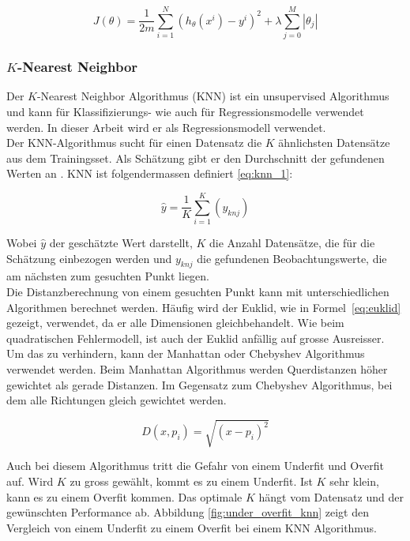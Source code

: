 \begin{equation}\label{eq:lasso}
J(\theta) = \frac{1}{2m} \sum_{i=1}^{N} (h_\theta(x^i) - y^i)^2 + \lambda \sum_{j=0}^{M} |\theta_j|
\end{equation}

\subsubsection{$K$-Nearest Neighbor}
Der $K$-Nearest Neighbor Algorithmus (KNN) ist ein unsupervised Algorithmus und kann für Klassifizierungs- wie auch für Regressionsmodelle verwendet werden. In dieser Arbeit wird er als Regressionsmodell verwendet.\\
Der KNN-Algorithmus sucht für einen Datensatz die $K$ ähnlichsten Datensätze aus dem Trainingsset. Als Schätzung gibt er den Durchschnitt der gefundenen Werten an \cite{knn_1}. KNN ist folgendermassen definiert \eqref{eq:knn_1}:

\begin{equation}\label{eq:knn_1}
\hat{y} = \frac{1}{K} \sum_{i=1}^{K} (y_{knj})
\end{equation}

Wobei $\hat{y}$ der geschätzte Wert darstellt, $K$ die Anzahl Datensätze, die für die Schätzung einbezogen werden und $y_{knj}$ die gefundenen Beobachtungswerte, die am nächsten zum gesuchten Punkt liegen.\\
Die Distanzberechnung von einem gesuchten Punkt kann mit unterschiedlichen Algorithmen berechnet werden. Häufig wird der Euklid, wie in Formel~\eqref{eq:euklid} gezeigt, verwendet, da er alle Dimensionen gleichbehandelt. Wie beim quadratischen Fehlermodell, ist auch der Euklid anfällig auf grosse Ausreisser. Um das zu verhindern, kann der Manhattan oder Chebyshev Algorithmus verwendet werden. Beim Manhattan Algorithmus werden Querdistanzen höher gewichtet als gerade Distanzen. Im Gegensatz zum Chebyshev Algorithmus, bei dem alle Richtungen gleich gewichtet werden.

\begin{equation}\label{eq:euklid}
D(x, p_i) = \sqrt{(x - p_i)^2}
\end{equation}

Auch bei diesem Algorithmus tritt die Gefahr von einem Underfit und Overfit auf. Wird $K$ zu gross gewählt, kommt es zu einem Underfit. Ist $K$ sehr klein, kann es zu einem Overfit kommen. Das optimale $K$ hängt vom Datensatz und der gewünschten Performance ab. Abbildung \ref{fig:under_overfit_knn} zeigt den Vergleich von einem Underfit zu einem Overfit bei einem KNN Algorithmus.

